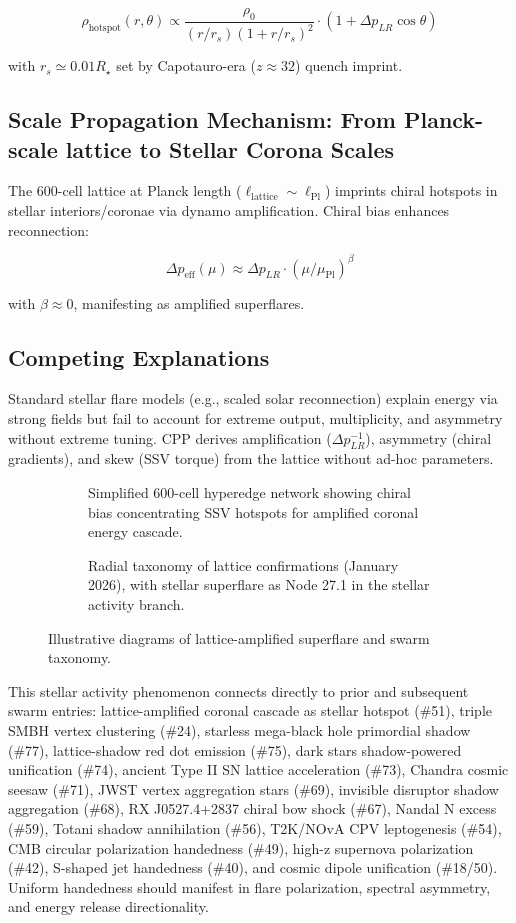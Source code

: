 \documentclass[11pt]{article}
\begin{document}
\[
\rho_{\text{hotspot}}(r,\theta) \propto \frac{\rho_0}{(r/r_s)(1 + r/r_s)^2} \cdot (1 + \Delta p_{LR} \cos\theta)
\]

with $r_s \simeq 0.01 R_\star$ set by Capotauro-era ($z \approx 32$) quench imprint.

\subsection{Scale Propagation Mechanism: From Planck-scale lattice to Stellar Corona Scales}
The 600-cell lattice at Planck length ($\ell_{\text{lattice}} \sim \ell_{\text{Pl}}$) imprints chiral hotspots in stellar interiors/coronae via dynamo amplification. Chiral bias enhances reconnection:

\[
\Delta p_{\text{eff}}(\mu) \approx \Delta p_{LR} \cdot (\mu / \mu_{\text{Pl}})^\beta
\]

with $\beta \approx 0$, manifesting as amplified superflares.

\subsection{Competing Explanations}
Standard stellar flare models (e.g., scaled solar reconnection) explain energy via strong fields but fail to account for extreme output, multiplicity, and asymmetry without extreme tuning. CPP derives amplification ($\Delta p_{LR}^{-1}$), asymmetry (chiral gradients), and skew (SSV torque) from the lattice without ad-hoc parameters.

\begin{figure}[htbp]
\centering
\begin{subfigure}{0.45\textwidth}
\centering
\caption{Simplified 600-cell hyperedge network showing chiral bias concentrating SSV hotspots for amplified coronal energy cascade.}
\label{fig:lattice-superflare}
\end{subfigure}
\hfill
\begin{subfigure}{0.45\textwidth}
\centering
\caption{Radial taxonomy of lattice confirmations (January 2026), with stellar superflare as Node 27.1 in the stellar activity branch.}
\label{fig:taxonomy}
\end{subfigure}
\caption{Illustrative diagrams of lattice-amplified superflare and swarm taxonomy.}
\end{figure}

This stellar activity phenomenon connects directly to prior and subsequent swarm entries: lattice-amplified coronal cascade as stellar hotspot (\#51), triple SMBH vertex clustering (\#24), starless mega-black hole primordial shadow (\#77), lattice-shadow red dot emission (\#75), dark stars shadow-powered unification (\#74), ancient Type II SN lattice acceleration (\#73), Chandra cosmic seesaw (\#71), JWST vertex aggregation stars (\#69), invisible disruptor shadow aggregation (\#68), RX J0527.4+2837 chiral bow shock (\#67), Nandal N excess (\#59), Totani shadow annihilation (\#56), T2K/NOvA CPV leptogenesis (\#54), CMB circular polarization handedness (\#49), high-z supernova polarization (\#42), S-shaped jet handedness (\#40), and cosmic dipole unification (\#18/50). Uniform handedness should manifest in flare polarization, spectral asymmetry, and energy release directionality.
\end{document}
